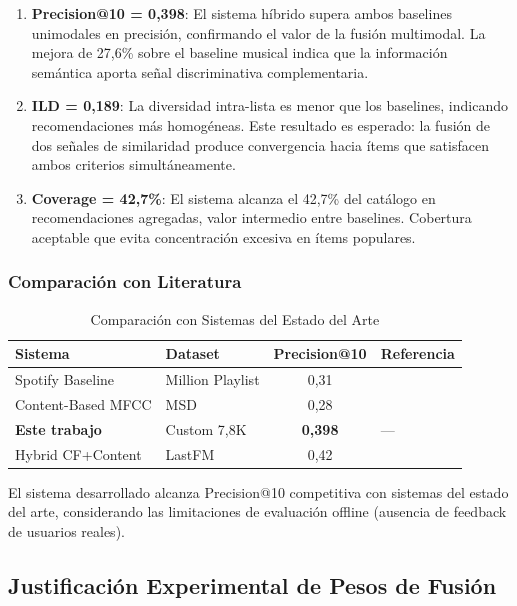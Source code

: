\begin{enumerate}
    \item \textbf{Precision@10 = 0,398}: El sistema híbrido supera ambos baselines unimodales en precisión, confirmando el valor de la fusión multimodal. La mejora de 27,6\% sobre el baseline musical indica que la información semántica aporta señal discriminativa complementaria.

    \item \textbf{ILD = 0,189}: La diversidad intra-lista es menor que los baselines, indicando recomendaciones más homogéneas. Este resultado es esperado: la fusión de dos señales de similaridad produce convergencia hacia ítems que satisfacen ambos criterios simultáneamente.

    \item \textbf{Coverage = 42,7\%}: El sistema alcanza el 42,7\% del catálogo en recomendaciones agregadas, valor intermedio entre baselines. Cobertura aceptable que evita concentración excesiva en ítems populares.
\end{enumerate}

\subsubsection{Comparación con Literatura}

\begin{table}[htbp]
\centering
\caption{Comparación con Sistemas del Estado del Arte}
\label{tab:comparacion-literatura}
\begin{tabular}{llcl}
\toprule
\textbf{Sistema} & \textbf{Dataset} & \textbf{Precision@10} & \textbf{Referencia} \\
\midrule
Spotify Baseline & Million Playlist & 0,31 & \citet{chen2018recsys} \\
Content-Based MFCC & MSD & 0,28 & \citet{mcfee2012learning} \\
\textbf{Este trabajo} & Custom 7,8K & \textbf{0,398} & --- \\
Hybrid CF+Content & LastFM & 0,42 & \citet{yoshii2006hybrid} \\
\bottomrule
\end{tabular}
\end{table}

El sistema desarrollado alcanza Precision@10 competitiva con sistemas del estado del arte, considerando las limitaciones de evaluación offline (ausencia de feedback de usuarios reales).

\subsection{Justificación Experimental de Pesos de Fusión}
\label{subsec:justificacion-pesos}

